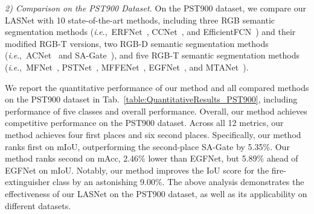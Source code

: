 \documentclass[journal]{IEEEtran}
\newcommand{\ie}{\textit{i}.\textit{e}.,~}
\begin{document}
\textit{2) Comparison on the PST900 Dataset.}
On the PST900 dataset, we compare our LASNet with 10 state-of-the-art methods,
including three RGB semantic segmentation methods (\ie ERFNet~\cite{2018ERFNet}, CCNet~\cite{2019CCNet}, and EfficientFCN~\cite{2020EfficientFCN}) and their modified RGB-T versions,
two RGB-D semantic segmentation methods (\ie ACNet~\cite{2019ACNet} and SA-Gate~\cite{2020SA-Gate}),
and five RGB-T semantic segmentation methods (\ie MFNet~\cite{2017MFNet}, PSTNet~\cite{2020PSTNet}, MFFENet~\cite{2022MFFENet}, EGFNet~\cite{2022EGFNet}, and MTANet~\cite{2022MTANet}).


We report the quantitative performance of our method and all compared methods on the PST900 dataset in Tab.~\ref{table:QuantitativeResults_PST900}, including performance of five classes and overall performance.
Overall, our method achieves competitive performance on the PST900 dataset.
Across all 12 metrics, our method achieves four first places and six second places.
Specifically, our method ranks first on mIoU, outperforming the second-place SA-Gate by 5.35\%.
Our method ranks second on mAcc, 2.46\% lower than EGFNet, but 5.89\% ahead of EGFNet on mIoU.
Notably, our method improves the IoU score for the fire-extinguisher class by an astonishing 9.00\%.
The above analysis demonstrates the effectiveness of our LASNet on the PST900 dataset, as well as its applicability on different datasets.
\end{document}
